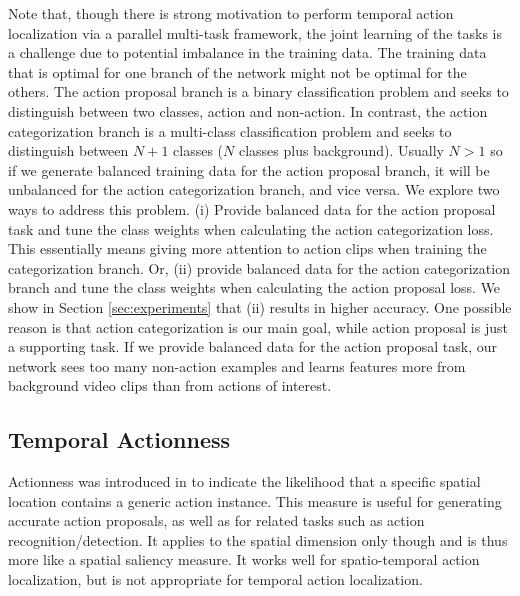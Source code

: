 \documentclass[10pt,twocolumn,letterpaper]{article}
\begin{document}
Note that, though there is strong motivation to perform temporal action localization via a parallel multi-task framework, the joint learning of the tasks is a challenge due to potential imbalance in the training data. The training data that is optimal for one branch of the network might not be optimal for the others. The action proposal branch is a binary classification problem and seeks to distinguish between two classes, action and non-action. In contrast, the action categorization branch is a multi-class classification problem and seeks to distinguish between $N+1$ classes ($N$ classes plus background). Usually $N > 1$ so if we generate balanced training data for the action proposal branch, it will be unbalanced for the action categorization branch, and vice versa. 
We explore two ways to address this problem. (i) Provide balanced data for the action proposal task and tune the class weights when calculating the action categorization loss. This essentially means giving more attention to action clips when training the categorization branch. Or, (ii) provide balanced data for the action categorization branch and tune the class weights when calculating the action proposal loss.
We show in Section \ref{sec:experiments} that (ii) results in higher accuracy. One possible reason is that action categorization is our main goal, while action proposal is just a supporting task. If we provide balanced data for the action proposal task, our network sees too many non-action examples and learns features more from background video clips than from actions of interest.

\subsection{Temporal Actionness}
Actionness was introduced in \cite{actionness_cvpr14_chen} to indicate the likelihood that a specific spatial location contains a generic action instance. This measure is useful for generating accurate action proposals, as well as for related tasks such as action recognition/detection. It applies to the spatial dimension only though and is thus more like a spatial saliency measure. It works well for spatio-temporal action localization, but is not appropriate for temporal action localization.
\end{document}
